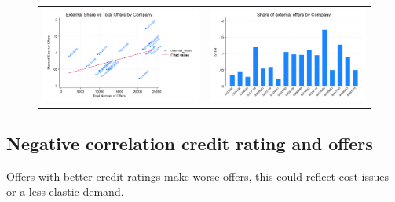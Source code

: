 \documentclass[12pt]{article}
\begin{document}
\begin{figure}[H]
\caption{}
 \label{fig:ie4_2and3}
\centering{}%
\begin{tabular}{cc}
\includegraphics[scale=0.17]{../figures/IE4/IE4_total_internal_offers_bycompany.png} & \includegraphics[scale=0.17]{../figures/IE4/IE4_variation_share_external.png}
\end{tabular}
\end{figure} 

\newpage
 
 
\subsection{Negative correlation credit rating and offers}

Offers with better credit ratings make worse offers, this could reflect cost issues or a less elastic demand. 
\end{document}
